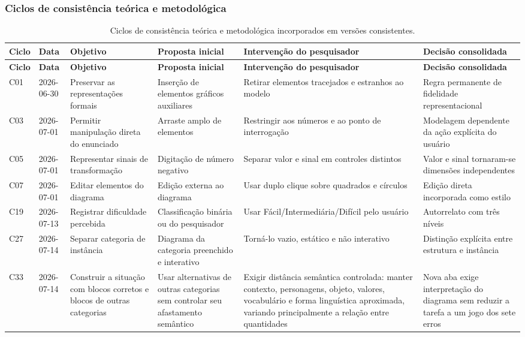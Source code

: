 \subsubsection{Ciclos de consistência teórica e metodológica}
\begin{landscape}
\begingroup
\setlength{\tabcolsep}{3pt}
\small
\begin{longtable}{p{1.0cm}p{1.9cm}p{4.0cm}p{5.0cm}p{6.2cm}p{5.7cm}}
\caption{Ciclos de consistência teórica e metodológica incorporados em versões consistentes.}\\
\toprule
\textbf{Ciclo} & \textbf{Data} & \textbf{Objetivo} & \textbf{Proposta inicial} & \textbf{Intervenção do pesquisador} & \textbf{Decisão consolidada} \\
\midrule
\endfirsthead
\toprule
\textbf{Ciclo} & \textbf{Data} & \textbf{Objetivo} & \textbf{Proposta inicial} & \textbf{Intervenção do pesquisador} & \textbf{Decisão consolidada} \\
\midrule
\endhead
C01 & 2026-06-30 & Preservar as representações formais & Inserção de elementos gráficos auxiliares & Retirar elementos tracejados e estranhos ao modelo & Regra permanente de fidelidade representacional \\
\addlinespace[2pt]
C03 & 2026-07-01 & Permitir manipulação direta do enunciado & Arraste amplo de elementos & Restringir aos números e ao ponto de interrogação & Modelagem dependente da ação explícita do usuário \\
\addlinespace[2pt]
C05 & 2026-07-01 & Representar sinais de transformação & Digitação de número negativo & Separar valor e sinal em controles distintos & Valor e sinal tornaram-se dimensões independentes \\
\addlinespace[2pt]
C07 & 2026-07-01 & Editar elementos do diagrama & Edição externa ao diagrama & Usar duplo clique sobre quadrados e círculos & Edição direta incorporada como estilo \\
\addlinespace[2pt]
C19 & 2026-07-13 & Registrar dificuldade percebida & Classificação binária ou do pesquisador & Usar Fácil/Intermediária/Difícil pelo usuário & Autorrelato com três níveis \\
\addlinespace[2pt]
C27 & 2026-07-14 & Separar categoria de instância & Diagrama da categoria preenchido e interativo & Torná-lo vazio, estático e não interativo & Distinção explícita entre estrutura e instância \\
\addlinespace[2pt]
C33 & 2026-07-14 & Construir a situação com blocos corretos e blocos de outras categorias & Usar alternativas de outras categorias sem controlar seu afastamento semântico & Exigir distância semântica controlada: manter contexto, personagens, objeto, valores, vocabulário e forma linguística aproximada, variando principalmente a relação entre quantidades & Nova aba exige interpretação do diagrama sem reduzir a tarefa a um jogo dos sete erros \\

\end{longtable}
\end{landscape}
